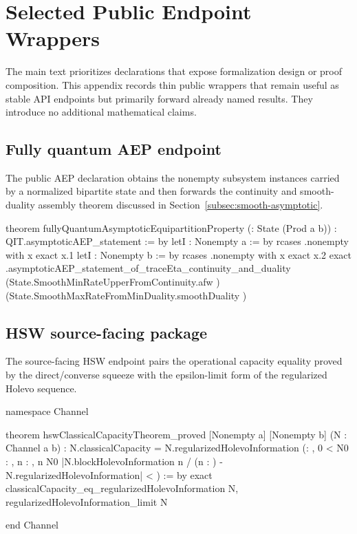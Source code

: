 \documentclass[10pt,a4paper]{article}
\begin{document}
\section{Selected Public Endpoint Wrappers}
\label{app:endpoint-wrappers}

The main text prioritizes declarations that expose formalization design or
proof composition.  This appendix records thin public wrappers that remain
useful as stable API endpoints but primarily forward already named results.
They introduce no additional mathematical claims.

\subsection{Fully quantum AEP endpoint}

The public AEP declaration obtains the nonempty subsystem instances carried by
a normalized bipartite state and then forwards the continuity and smooth-duality
assembly theorem discussed in Section~\ref{subsec:smooth-asymptotic}.

\begin{qitleancode}[title={Fully quantum AEP endpoint}]
theorem fullyQuantumAsymptoticEquipartitionProperty
    (\rho : State (Prod a b)) :
    QIT.asymptoticAEP_statement \rho := by
  letI : Nonempty a := by
    rcases \rho.nonempty with \langle x\rangle
    exact \langle x.1\rangle
  letI : Nonempty b := by
    rcases \rho.nonempty with \langle x\rangle
    exact \langle x.2\rangle
  exact \rho.asymptoticAEP_statement_of_traceEta_continuity_and_duality
    (State.SmoothMinRateUpperFromContinuity.afw \rho)
    (State.SmoothMaxRateFromMinDuality.smoothDuality \rho)
\end{qitleancode}
	
	\subsection{HSW source-facing package}
	
	The source-facing HSW endpoint pairs the operational capacity equality proved
	by the direct/converse squeeze with the epsilon-limit form of the regularized
	Holevo sequence.
	
\begin{qitleancode}[title={HSW public endpoint}]
namespace Channel

theorem hswClassicalCapacityTheorem_proved
    [Nonempty a] [Nonempty b] (N : Channel a b) :
    N.classicalCapacity = N.regularizedHolevoInformation \wedge
      (\forall \epsilon : \mathbbR, 0 < \epsilon \to
        \exists N0 : \mathbbN, \forall n : \mathbbN, n \ge N0 \to
          |N.blockHolevoInformation n / (n : \mathbbR) -
            N.regularizedHolevoInformation| < \epsilon) := by
  exact \langle classicalCapacity_eq_regularizedHolevoInformation N,
    regularizedHolevoInformation_limit N\rangle

end Channel
\end{qitleancode}
	
\end{document}
